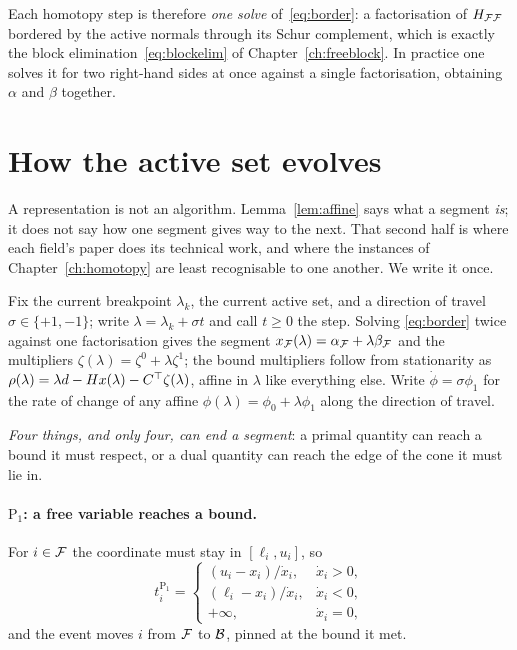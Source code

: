 Each homotopy step is therefore \emph{one solve} of~\eqref{eq:border}: a
factorisation of $H_{\mathcal{F}\mathcal{F}}$ bordered by the active normals through its Schur
complement, which is exactly the block elimination~\eqref{eq:blockelim} of
Chapter~\ref{ch:freeblock}. In practice one solves it for two right-hand sides at
once against a single factorisation, obtaining $\alpha$ and $\beta$ together.

\section{How the active set evolves}
\label{sec:events}

A representation is not an algorithm. Lemma~\ref{lem:affine} says what a segment
\emph{is}; it does not say how one segment gives way to the next. That second half
is where each field's paper does its technical work, and where the instances of
Chapter~\ref{ch:homotopy} are least recognisable to one another. We write it once.

Fix the current breakpoint $\lambda_k$, the current active set, and a direction of
travel $\sigma \in \{+1,-1\}$; write $\lambda = \lambda_k + \sigma t$ and call
$t \ge 0$ the step. Solving \eqref{eq:border} twice against one factorisation gives
the segment $x_{\mathcal{F}}(\lambda) = \alpha_{\mathcal{F}} + \lambda\beta_{\mathcal{F}}$ and the
multipliers $\zeta(\lambda) = \zeta^0 + \lambda\zeta^1$; the bound multipliers follow
from stationarity as $\rho(\lambda) = \lambda d - Hx(\lambda) - C^{\top}\zeta(\lambda)$,
affine in $\lambda$ like everything else. Write $\dot\phi = \sigma\phi_1$ for the
rate of change of any affine $\phi(\lambda) = \phi_0 + \lambda\phi_1$ along the
direction of travel.

\emph{Four things, and only four, can end a segment}: a primal quantity can reach a
bound it must respect, or a dual quantity can reach the edge of the cone it must lie
in.

\paragraph{$\mathrm{P}_1$: a free variable reaches a bound.} For $i \in \mathcal{F}$ the
coordinate must stay in $[\ell_i,u_i]$, so
\[
t^{\mathrm{P}_1}_i =
\begin{cases}
(u_i - x_i)/\dot x_i, & \dot x_i>0,\\
(\ell_i - x_i)/\dot x_i, & \dot x_i<0,\\
+\infty, & \dot x_i=0,
\end{cases}
\]
and the event moves $i$ from $\mathcal{F}$ to $\mathcal{B}$, pinned at the bound it met.

